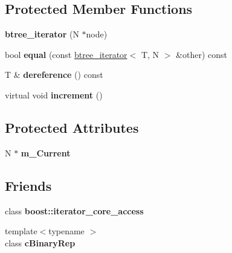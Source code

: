 \subsection*{Protected Member Functions}
\begin{DoxyCompactItemize}
\item 
\hypertarget{classtree_1_1btree__iterator_a9d7d63a542d5ed607bc93363080b247f}{{\bfseries btree\-\_\-iterator} (N $\ast$node)}\label{classtree_1_1btree__iterator_a9d7d63a542d5ed607bc93363080b247f}

\item 
\hypertarget{classtree_1_1btree__iterator_adaa03d21cddbb44f64abdfcfc92a15b4}{bool {\bfseries equal} (const \hyperlink{classtree_1_1btree__iterator}{btree\-\_\-iterator}$<$ T, N $>$ \&other) const }\label{classtree_1_1btree__iterator_adaa03d21cddbb44f64abdfcfc92a15b4}

\item 
\hypertarget{classtree_1_1btree__iterator_a2614a710559163bd7f8b8b9ea2998073}{T \& {\bfseries dereference} () const }\label{classtree_1_1btree__iterator_a2614a710559163bd7f8b8b9ea2998073}

\item 
\hypertarget{classtree_1_1btree__iterator_ac226882e50211134cae92e2d3a70a05a}{virtual void {\bfseries increment} ()}\label{classtree_1_1btree__iterator_ac226882e50211134cae92e2d3a70a05a}

\end{DoxyCompactItemize}
\subsection*{Protected Attributes}
\begin{DoxyCompactItemize}
\item 
\hypertarget{classtree_1_1btree__iterator_a3fe0a773310404a612dc9a46abfd5471}{N $\ast$ {\bfseries m\-\_\-\-Current}}\label{classtree_1_1btree__iterator_a3fe0a773310404a612dc9a46abfd5471}

\end{DoxyCompactItemize}
\subsection*{Friends}
\begin{DoxyCompactItemize}
\item 
\hypertarget{classtree_1_1btree__iterator_ac09f73e325921cc50ebcd96bed0f8096}{class {\bfseries boost\-::iterator\-\_\-core\-\_\-access}}\label{classtree_1_1btree__iterator_ac09f73e325921cc50ebcd96bed0f8096}

\item 
\hypertarget{classtree_1_1btree__iterator_a67351aca5736373fedb6ae0a9469fe66}{{\footnotesize template$<$typename $>$ }\\class {\bfseries c\-Binary\-Rep}}\label{classtree_1_1btree__iterator_a67351aca5736373fedb6ae0a9469fe66}

\end{DoxyCompactItemize}


